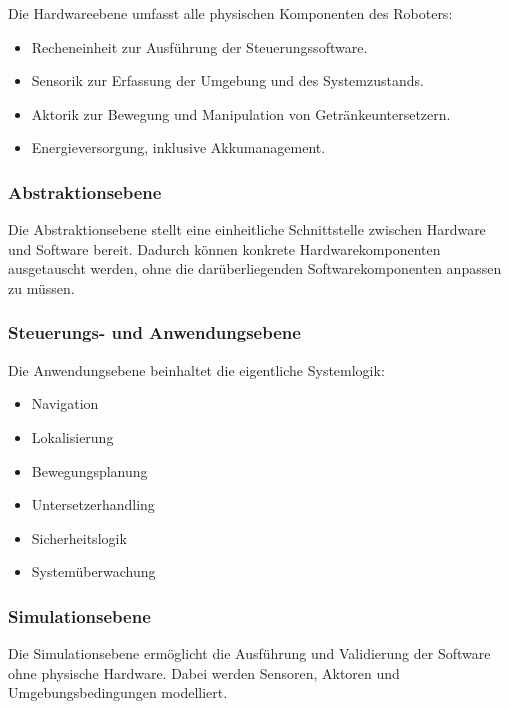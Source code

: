 \documentclass[
  a4paper,
  12pt,
  DIV=12,        %
  parskip=half,  %
  headings=small %
]{scrartcl}
\theoremstyle{definition}
\providecommand{\tightlist}{%
  \setlength{\itemsep}{0pt}\setlength{\parskip}{0pt}}
\theoremstyle{definition}
\begin{document}
Die Hardwareebene umfasst alle physischen Komponenten des Roboters:

\begin{itemize}
\tightlist
\item
  Recheneinheit zur Ausführung der Steuerungssoftware.
\item
  Sensorik zur Erfassung der Umgebung und des Systemzustands.
\item
  Aktorik zur Bewegung und Manipulation von Getränkeuntersetzern.
\item
  Energieversorgung, inklusive Akkumanagement.
\end{itemize}

\subsubsection{Abstraktionsebene}\label{abstraktionsebene}

Die Abstraktionsebene stellt eine einheitliche Schnittstelle zwischen
Hardware und Software bereit. Dadurch können konkrete
Hardwarekomponenten ausgetauscht werden, ohne die darüberliegenden
Softwarekomponenten anpassen zu müssen.

\subsubsection{Steuerungs- und
Anwendungsebene}\label{steuerungs--und-anwendungsebene}

Die Anwendungsebene beinhaltet die eigentliche Systemlogik:

\begin{itemize}
\tightlist
\item
  Navigation
\item
  Lokalisierung
\item
  Bewegungsplanung
\item
  Untersetzerhandling
\item
  Sicherheitslogik
\item
  Systemüberwachung
\end{itemize}

\subsubsection{Simulationsebene}\label{simulationsebene}

Die Simulationsebene ermöglicht die Ausführung und Validierung der
Software ohne physische Hardware. Dabei werden Sensoren, Aktoren und
Umgebungsbedingungen modelliert.
\end{document}
